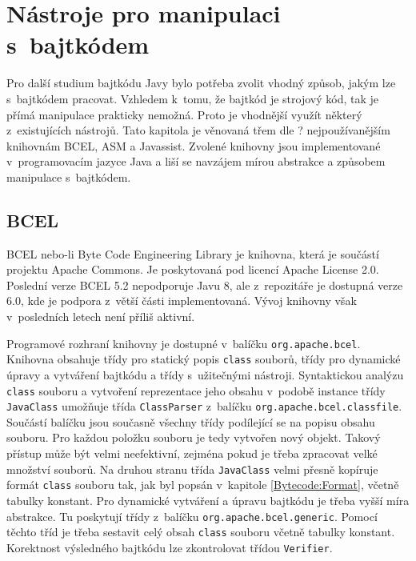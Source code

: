 \chapter{Nástroje pro manipulaci s~bajtkódem}\label{Tools}

Pro další studium bajtkódu Javy bylo potřeba zvolit vhodný způsob, jakým lze s~bajtkódem pracovat.
Vzhledem k~tomu, že bajtkód je strojový kód, tak je přímá manipulace prakticky nemožná. Proto je vhodnější využít některý z~existujících nástrojů. Tato kapitola je věnovaná třem 
dle ? \cite{} 
nejpoužívanějším knihovnám BCEL, ASM a Javassist. Zvolené knihovny jsou implementované v~programovacím jazyce Java a liší se navzájem mírou abstrakce a způsobem manipulace s~bajtkódem.


\section{BCEL}\label{Tools:BCEL}


BCEL \cite{BCEL} nebo-li Byte Code Engineering Library je knihovna, která je součástí projektu Apache Commons. Je poskytovaná pod licencí Apache License 2.0. Poslední verze BCEL 5.2 nepodporuje Javu 8, ale z~repozitáře je dostupná verze 6.0, kde je podpora z~větší části implementovaná. Vývoj knihovny však v~posledních letech není příliš aktivní. 

Programové rozhraní knihovny je dostupné v~balíčku \texttt{org.apache.bcel}. Knihovna obsahuje třídy pro statický popis \texttt{class} souborů, třídy pro dynamické úpravy a vytváření bajtkódu a třídy s~užitečnými nástroji. Syntaktickou analýzu \texttt{class} souboru a vytvoření reprezentace jeho obsahu v~podobě instance třídy \texttt{JavaClass} umožňuje třída \texttt{ClassParser} z~balíčku \texttt{org.apache.bcel.classfile}. Součástí balíčku jsou současně všechny třídy podílející se na popisu obsahu souboru. Pro každou položku souboru je tedy vytvořen nový objekt. Takový přístup může být velmi neefektivní, zejména pokud je třeba zpracovat velké množství souborů. Na druhou stranu třída \texttt{JavaClass} velmi přesně kopíruje formát \texttt{class} souboru tak, jak byl popsán v~kapitole \ref{Bytecode:Format}, včetně tabulky konstant.
Pro dynamické vytváření a úpravu bajtkódu je třeba vyšší míra abstrakce. Tu poskytují třídy z~balíčku \texttt{org.apache.bcel.generic}. Pomocí těchto tříd je třeba sestavit celý obsah \texttt{class} souboru včetně tabulky konstant. Korektnost výsledného bajtkódu lze zkontrolovat třídou \texttt{Verifier}.


